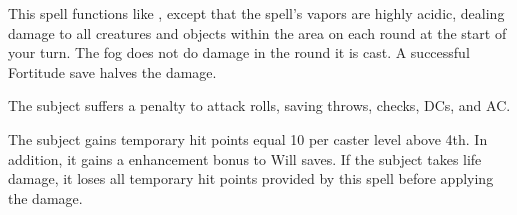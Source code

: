 \spellrng{\rngmed}
\spelldur{\durshort}
\begin{spelleffect}
  This spell functions like , except that the spell's vapors are highly acidic, dealing damage to all creatures and objects within the area on each round at the start of your turn. The fog does not do damage in the round it is cast. A successful Fortitude save halves the damage.
\end{spelleffect}

\spellrng{\rngmed}
\begin{spelleffect}
  The subject suffers a  penalty to attack rolls, saving throws, checks, DCs, and AC.
\end{spelleffect}

\spellrng{\rngclose}
\spelldur{\durshort}
\begin{spelleffect}
  The subject gains temporary hit points equal 10  per caster level above 4th. In addition, it gains a  enhancement bonus to Will saves. \bonusscalingdescription  If the subject takes life damage, it loses all temporary hit points provided by this spell before applying the damage.
\end{spelleffect}

